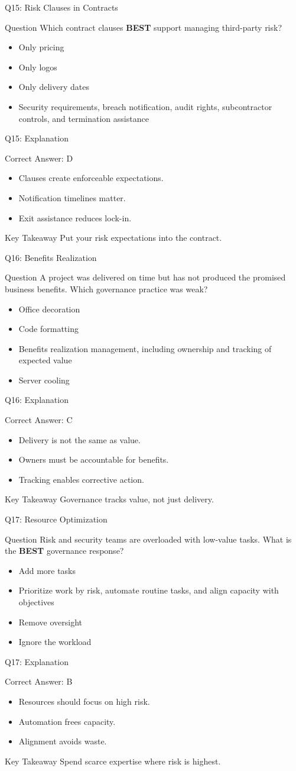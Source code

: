 \documentclass[aspectratio=169]{beamer}
\newcommand{\hq}[7]{%
	\begin{frame}{Q#1: #2}
		\begin{block}{Question}
			#3
		\end{block}
		\begin{itemize}
			#4
		\end{itemize}
	\end{frame}
	\begin{frame}{Q#1: Explanation}
		\begin{block}{Correct Answer: #5}
			\begin{itemize}
				#6
			\end{itemize}
		\end{block}
		\begin{alertblock}{Key Takeaway}
			#7
		\end{alertblock}
	\end{frame}
}
\begin{document}
	\hq{15}{Risk Clauses in Contracts}
	{Which contract clauses \textbf{BEST} support managing third-party risk?}
	{\item[\textbf{(A)}] Only pricing
		\item[\textbf{(B)}] Only logos
		\item[\textbf{(C)}] Only delivery dates
		\item[\textbf{(D)}] Security requirements, breach notification, audit rights, subcontractor controls, and termination assistance}
	{D}
	{\item Clauses create enforceable expectations.
		\item Notification timelines matter.
		\item Exit assistance reduces lock-in.}
	{Put your risk expectations into the contract.}

	\hq{16}{Benefits Realization}
	{A project was delivered on time but has not produced the promised business benefits. Which governance practice was weak?}
	{\item[\textbf{(A)}] Office decoration
		\item[\textbf{(B)}] Code formatting
		\item[\textbf{(C)}] Benefits realization management, including ownership and tracking of expected value
		\item[\textbf{(D)}] Server cooling}
	{C}
	{\item Delivery is not the same as value.
		\item Owners must be accountable for benefits.
		\item Tracking enables corrective action.}
	{Governance tracks value, not just delivery.}

	\hq{17}{Resource Optimization}
	{Risk and security teams are overloaded with low-value tasks. What is the \textbf{BEST} governance response?}
	{\item[\textbf{(A)}] Add more tasks
		\item[\textbf{(B)}] Prioritize work by risk, automate routine tasks, and align capacity with objectives
		\item[\textbf{(C)}] Remove oversight
		\item[\textbf{(D)}] Ignore the workload}
	{B}
	{\item Resources should focus on high risk.
		\item Automation frees capacity.
		\item Alignment avoids waste.}
	{Spend scarce expertise where risk is highest.}
\end{document}

